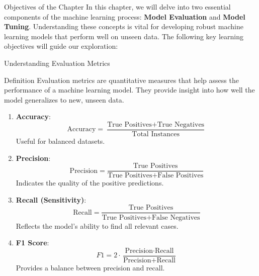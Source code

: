 \documentclass[aspectratio=169]{beamer}
\begin{document}
\begin{frame}[fragile]{Objectives of the Chapter}
    In this chapter, we will delve into two essential components of the machine learning process: 
    \textbf{Model Evaluation} and \textbf{Model Tuning}. 
    Understanding these concepts is vital for developing robust machine learning models that perform well 
    on unseen data. The following key learning objectives will guide our exploration:
\end{frame}

\begin{frame}[fragile]{Understanding Evaluation Metrics}
    \begin{block}{Definition}
        Evaluation metrics are quantitative measures that help assess the performance of a machine learning model. They provide insight into how well the model generalizes to new, unseen data.
    \end{block}
    
    \begin{enumerate}
        \item \textbf{Accuracy}:
        \[
        \text{Accuracy} = \frac{\text{True Positives} + \text{True Negatives}}{\text{Total Instances}}
        \]
        Useful for balanced datasets.
        
        \item \textbf{Precision}:
        \[
        \text{Precision} = \frac{\text{True Positives}}{\text{True Positives} + \text{False Positives}}
        \]
        Indicates the quality of the positive predictions.
        
        \item \textbf{Recall (Sensitivity)}:
        \[
        \text{Recall} = \frac{\text{True Positives}}{\text{True Positives} + \text{False Negatives}}
        \]
        Reflects the model's ability to find all relevant cases.

        \item \textbf{F1 Score}:
        \[
        F1 = 2 \cdot \frac{\text{Precision} \cdot \text{Recall}}{\text{Precision} + \text{Recall}}
        \]
        Provides a balance between precision and recall.
    \end{enumerate}
\end{frame}
\end{document}
